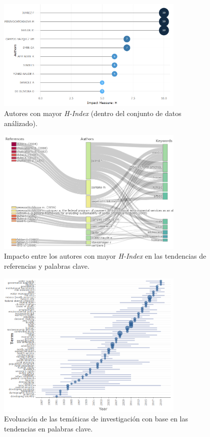 \begin{figure}[ht]
	\centering
	\includegraphics[width=0.8\textwidth]{imagenes/au_hindex.png}
	\caption{Autores con mayor \textit{H-Index} (dentro del conjunto de datos análizado).}
	\label{fig:au_hindex} 
\end{figure}

\begin{figure}[hp]

	\centering
	\includegraphics[width=0.8\textwidth]{imagenes/three_field.png}
	\caption{Impacto entre los autores con mayor \textit{H-Index} en las tendencias de referencias y palabras clave.}
	\label{fig:3field} 
\end{figure}

\begin{figure}[ht]
	
	\centering
	\includegraphics[width=0.8\textwidth]{imagenes/trend_topics.png}
	\caption{Evoluación de las temáticas de investigación con base en las tendencias en palabras clave.}
	\label{fig:trend_topic} 
\end{figure}


